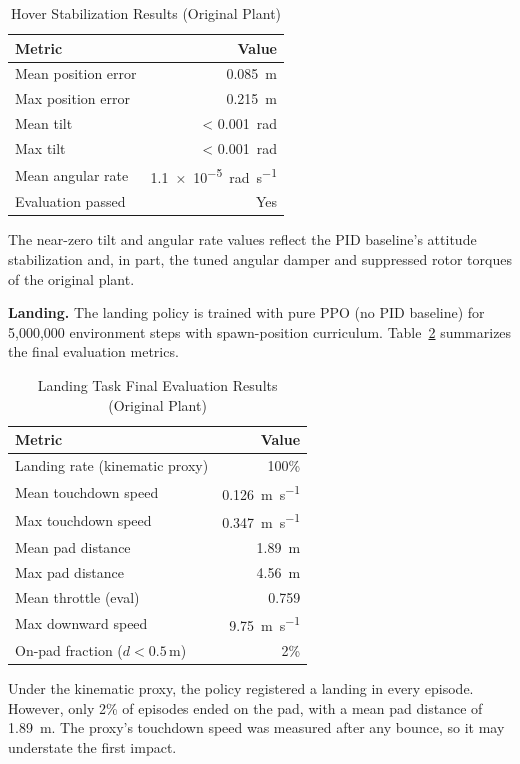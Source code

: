 \documentclass[conference]{IEEEtran}
\begin{document}
\begin{table}[htbp]
\caption{Hover Stabilization Results (Original Plant)}
\label{tab:hover_results}
\centering
\begin{tabular}{lr}
\toprule
\textbf{Metric} & \textbf{Value} \\
\midrule
Mean position error & \SI{0.085}{\metre} \\
Max position error & \SI{0.215}{\metre} \\
Mean tilt & \SI{< 0.001}{\radian} \\
Max tilt & \SI{< 0.001}{\radian} \\
Mean angular rate & \SI{1.1e-5}{\radian\per\second} \\
Evaluation passed & Yes \\
\bottomrule
\end{tabular}
\end{table}

The near-zero tilt and angular rate values reflect the PID baseline's attitude stabilization and, in part, the tuned angular damper and suppressed rotor torques of the original plant.

\textbf{Landing.} The landing policy is trained with pure PPO (no PID baseline) for 5{,}000{,}000 environment steps with spawn-position curriculum. Table~\ref{tab:landing_results} summarizes the final evaluation metrics.

\begin{table}[htbp]
\caption{Landing Task Final Evaluation Results (Original Plant)}
\label{tab:landing_results}
\centering
\begin{tabular}{lr}
\toprule
\textbf{Metric} & \textbf{Value} \\
\midrule
Landing rate (kinematic proxy) & 100\% \\
Mean touchdown speed & \SI{0.126}{\metre\per\second} \\
Max touchdown speed & \SI{0.347}{\metre\per\second} \\
Mean pad distance & \SI{1.89}{\metre} \\
Max pad distance & \SI{4.56}{\metre} \\
Mean throttle (eval) & 0.759 \\
Max downward speed & \SI{9.75}{\metre\per\second} \\
On-pad fraction ($d < 0.5$\,m) & 2\% \\
\bottomrule
\end{tabular}
\end{table}

Under the kinematic proxy, the policy registered a landing in every episode. However, only 2\% of episodes ended on the pad, with a mean pad distance of \SI{1.89}{\metre}. The proxy's touchdown speed was measured after any bounce, so it may understate the first impact.
\end{document}

